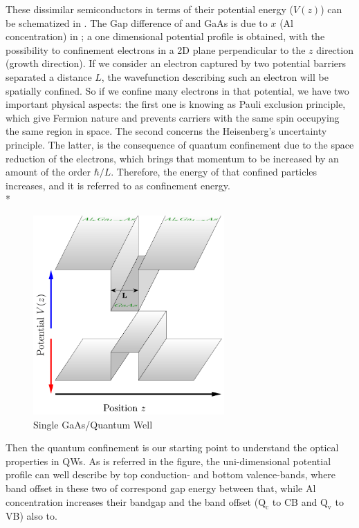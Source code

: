 These  dissimilar semiconductors in terms of their potential energy ($V(z)$) can be schematized in . The Gap difference of \algaas and GaAs is due to $x$ (Al concentration) in \algaas;  a one dimensional potential profile is obtained, with the possibility to confinement electrons in a 2D plane perpendicular to the  $z$ direction (growth direction). 
If we consider an electron captured by two potential barriers separated a distance $L$, the wavefunction describing such an electron will be spatially confined.
So if we confine many electrons in that potential,  we have two important physical aspects: the first one is knowing as Pauli exclusion principle, which give Fermion nature and prevents carriers with the same spin occupying the same region in  space\cite{harrison2016quantum,pauli1925zusammenhang}. The second  concerns the Heisenberg's uncertainty principle. 
The latter, is the consequence of quantum confinement due to the space reduction of the electrons, which brings that momentum to be increased by an amount of the order $\hbar/L$. Therefore, the energy of that confined particles increases, and it is referred to as confinement energy\cite{cardona2005fundamentals}. \\*
\begin{figure}
	\centering
	\includegraphics[width=0.65\textwidth]{../figures/chapter-1/heterostructures/out/qw1}
	\caption{Single GaAs/\algaas Quantum Well }
	\label{fig:subsection-1.2-single-quantum-well-scheme}
\end{figure}
Then the quantum confinement is our starting point to understand the optical properties in \gls{QW}s. As is referred in the figure, the uni-dimensional potential profile can well describe by top conduction- and bottom valence-bands, where band offset in these two of correspond gap energy between that, while Al concentration increases their bandgap and the band offset ($\mathrm{Q_{c}}$ to \gls{CB} and $\mathrm{Q_{v}}$ to \gls{VB}) also to.   

